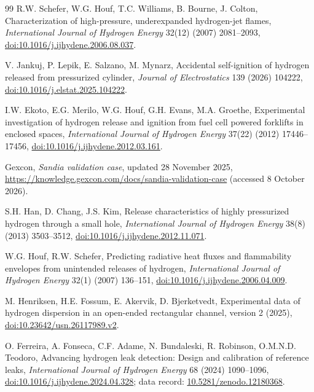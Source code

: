 \documentclass[12pt,a4paper]{article}
\begin{document}
\begin{thebibliography}{99}
R.W. Schefer, W.G. Houf, T.C. Williams, B. Bourne, J. Colton,
Characterization of high-pressure, underexpanded hydrogen-jet flames,
\textit{International Journal of Hydrogen Energy} 32(12) (2007) 2081--2093,
\href{https://doi.org/10.1016/j.ijhydene.2006.08.037}{doi:10.1016/j.ijhydene.2006.08.037}.

V. Jankuj, P. Lepik, E. Salzano, M. Mynarz, Accidental self-ignition of hydrogen
released from pressurized cylinder, \textit{Journal of Electrostatics} 139
(2026) 104222,
\href{https://doi.org/10.1016/j.elstat.2025.104222}{doi:10.1016/j.elstat.2025.104222}.

I.W. Ekoto, E.G. Merilo, W.G. Houf, G.H. Evans, M.A. Groethe,
Experimental investigation of hydrogen release and ignition from fuel cell
powered forklifts in enclosed spaces, \textit{International Journal of Hydrogen
Energy} 37(22) (2012) 17446--17456,
\href{https://doi.org/10.1016/j.ijhydene.2012.03.161}{doi:10.1016/j.ijhydene.2012.03.161}.

Gexcon, \textit{Sandia validation case}, updated 28 November 2025,
\url{https://knowledge.gexcon.com/docs/sandia-validation-case}
(accessed 8 October 2026).

S.H. Han, D. Chang, J.S. Kim, Release characteristics of highly pressurized
hydrogen through a small hole, \textit{International Journal of Hydrogen Energy}
38(8) (2013) 3503--3512,
\href{https://doi.org/10.1016/j.ijhydene.2012.11.071}{doi:10.1016/j.ijhydene.2012.11.071}.

W.G. Houf, R.W. Schefer, Predicting radiative heat fluxes and flammability
envelopes from unintended releases of hydrogen, \textit{International Journal of
Hydrogen Energy} 32(1) (2007) 136--151,
\href{https://doi.org/10.1016/j.ijhydene.2006.04.009}{doi:10.1016/j.ijhydene.2006.04.009}.

M. Henriksen, H.E. Fossum, E. Akervik, D. Bjerketvedt, Experimental data of
hydrogen dispersion in an open-ended rectangular channel, version 2 (2025),
\href{https://doi.org/10.23642/usn.26117989.v2}{doi:10.23642/usn.26117989.v2}.

O. Ferreira, A. Fonseca, C.F. Adame, N. Bundaleski, R. Robinson,
O.M.N.D. Teodoro, Advancing hydrogen leak detection: Design and calibration
of reference leaks, \textit{International Journal of Hydrogen Energy} 68
(2024) 1090--1096,
\href{https://doi.org/10.1016/j.ijhydene.2024.04.328}{doi:10.1016/j.ijhydene.2024.04.328};
data record: \href{https://doi.org/10.5281/zenodo.12180368}{10.5281/zenodo.12180368}.


\end{thebibliography}
\end{document}
